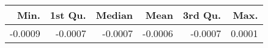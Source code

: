 \begin{table}[ht]
\centering
\begin{tabular}{rrrrrr}
  \hline
Min. & 1st Qu. & Median & Mean & 3rd Qu. & Max. \\ 
  \hline
-0.0009 & -0.0007 & -0.0007 & -0.0006 & -0.0007 & 0.0001 \\ 
   \hline
\end{tabular}
\end{table}
